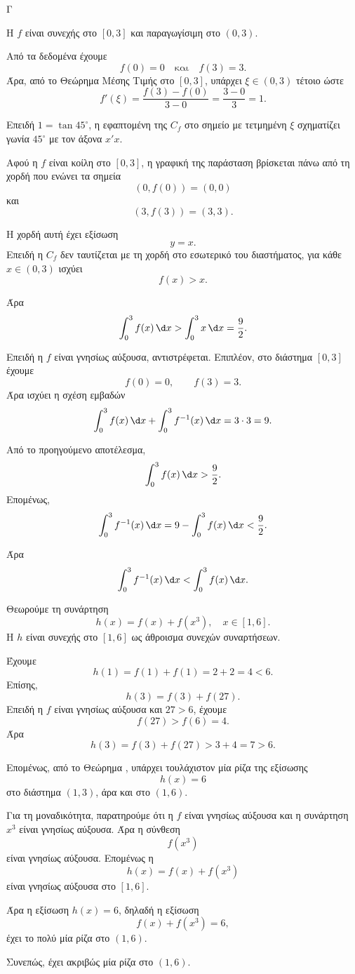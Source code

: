 \begin{thema}{Γ}
\begin{erwthma}
\item Η $f$ είναι συνεχής στο $[0,3]$ και παραγωγίσιμη στο $(0,3)$.

Από τα δεδομένα έχουμε
\[
f(0)=0
\quad \text{και}\quad
f(3)=3.
\]
Άρα, από το Θεώρημα Μέσης Τιμής στο $[0,3]$, υπάρχει $\xi\in(0,3)$ τέτοιο ώστε
\[
f'(\xi)=\frac{f(3)-f(0)}{3-0}
=\frac{3-0}{3}=1.
\]

Επειδή $1=\tan 45^\circ$, η εφαπτομένη της $C_f$ στο σημείο με τετμημένη $\xi$ σχηματίζει γωνία $45^\circ$ με τον άξονα $x'x$.

\item Αφού η $f$ είναι κοίλη στο $[0,3]$, η γραφική της παράσταση βρίσκεται πάνω από τη χορδή που ενώνει τα σημεία
\[
(0,f(0))=(0,0)
\]
και
\[
(3,f(3))=(3,3).
\]

Η χορδή αυτή έχει εξίσωση
\[
y=x.
\]
Επειδή η $C_f$ δεν ταυτίζεται με τη χορδή στο εσωτερικό του διαστήματος, για κάθε $x\in(0,3)$ ισχύει
\[
f(x)>x.
\]

Άρα
\[
\int_0^3 f(x)\,\d x>\int_0^3 x\,\d x=\frac{9}{2}.
\]

Επειδή η $f$ είναι γνησίως αύξουσα, αντιστρέφεται. Επιπλέον, στο διάστημα $[0,3]$ έχουμε
\[
f(0)=0,\qquad f(3)=3.
\]
Άρα ισχύει η σχέση εμβαδών
\[
\int_0^3 f(x)\,\d x+\int_0^3 f^{-1}(x)\,\d x=3\cdot 3=9.
\]

Από το προηγούμενο αποτέλεσμα,
\[
\int_0^3 f(x)\,\d x>\frac{9}{2}.
\]
Επομένως,
\[
\int_0^3 f^{-1}(x)\,\d x
=9-\int_0^3 f(x)\,\d x
<\frac{9}{2}.
\]

Άρα
\[
\int_0^3 f^{-1}(x)\,\d x<\int_0^3 f(x)\,\d x.
\]

\item Θεωρούμε τη συνάρτηση
\[
h(x)=f(x)+f(x^3),\quad x\in[1,6].
\]
Η $h$ είναι συνεχής στο $[1,6]$ ως άθροισμα συνεχών συναρτήσεων.

Έχουμε
\[
h(1)=f(1)+f(1)=2+2=4<6.
\]
Επίσης,
\[
h(3)=f(3)+f(27).
\]
Επειδή η $f$ είναι γνησίως αύξουσα και $27>6$, έχουμε
\[
f(27)>f(6)=4.
\]
Άρα
\[
h(3)=f(3)+f(27)>3+4=7>6.
\]

Επομένως, από το Θεώρημα , υπάρχει τουλάχιστον μία ρίζα της εξίσωσης
\[
h(x)=6
\]
στο διάστημα $(1,3)$, άρα και στο $(1,6)$.

Για τη μοναδικότητα, παρατηρούμε ότι η $f$ είναι γνησίως αύξουσα και η συνάρτηση $x^3$ είναι γνησίως αύξουσα. Άρα η σύνθεση
\[
f(x^3)
\]
είναι γνησίως αύξουσα. Επομένως η
\[
h(x)=f(x)+f(x^3)
\]
είναι γνησίως αύξουσα στο $[1,6]$.

Άρα η εξίσωση $h(x)=6$, δηλαδή η εξίσωση
\[
f(x)+f(x^3)=6,
\]
έχει το πολύ μία ρίζα στο $(1,6)$.

Συνεπώς, έχει ακριβώς μία ρίζα στο $(1,6)$.
\end{erwthma}
\end{thema}

